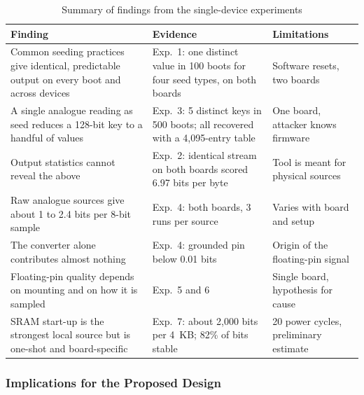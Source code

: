 \documentclass[a4paper, 12pt]{article}
\begin{document}
\begin{table}[htbp]
\centering
\small
\caption{Summary of findings from the single-device experiments}
\label{tab:bp_summary}
\begin{tabularx}{\textwidth}{@{}p{}Xp{}@{}}
\toprule
\textbf{Finding} & \textbf{Evidence} & \textbf{Limitations} \\
\midrule
Common seeding practices give identical, predictable output on every boot and across devices & Exp.~1: one distinct value in 100 boots for four seed types, on both boards & Software resets, two boards \\
A single analogue reading as seed reduces a 128-bit key to a handful of values & Exp.~3: 5 distinct keys in 500 boots; all recovered with a 4,095-entry table & One board, attacker knows firmware \\
Output statistics cannot reveal the above & Exp.~2: identical stream on both boards scored 6.97 bits per byte & Tool is meant for physical sources \\
Raw analogue sources give about 1 to 2.4 bits per 8-bit sample & Exp.~4: both boards, 3 runs per source & Varies with board and setup \\
The converter alone contributes almost nothing & Exp.~4: grounded pin below 0.01 bits & Origin of the floating-pin signal\\
Floating-pin quality depends on mounting and on how it is sampled & Exp.~5 and 6 & Single board, hypothesis for cause \\
SRAM start-up is the strongest local source but is one-shot and board-specific & Exp.~7: about 2,000 bits per 4~KB; 82\% of bits stable & 20 power cycles, preliminary estimate \\
\bottomrule
\end{tabularx}
\end{table}
 
\subsubsection{Implications for the Proposed Design}
\label{sec:bp_implications}
 
\end{document}
